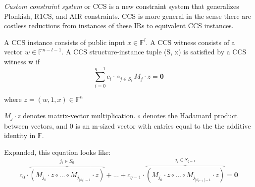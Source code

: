\documentclass[
    9pt,            %
    techreport,        %
    affiltop,       %
]{art}
\begin{document}
\textit{Custom constraint system} or CCS is a new constraint system that generalizes Plonkish, R1CS, and AIR constraints. CCS is more general in the sense there are costless reductions from instances of these IRs to equivalent CCS instances.

A CCS instance consists of public input $x \in \mathbb{F}^l$. A CCS witness consists of a vector $w \in \mathbb{F}^{n-l-1}$. A CCS structure-instance tuple (S, x) is satisfied by a CCS witness w if 
\begin{equation}
    \sum_{i=0}^{q-1} c_i \cdot \circ_{j \in S_i} M_j \cdot z = \mathbf{0}
\end{equation}

where $z = (w, 1, x) \in \mathbb{F}^n$

$M_j \cdot z$ denotes matrix-vector multiplication. $\circ$ denotes the Hadamard product between vectors, and 0 is an m-sized vector with entries equal to the the additive identity in $\mathbb{F}$.

Expanded, this equation looks like:
\begin{equation*}
    c_0 \cdot \overbrace{(M_{j_{0}} \cdot z \circ ... \circ M_{j_{|{S_{0}}|-1}} \cdot z)}^{j_i \in S_0} + ... + c_{q-1} \cdot \overbrace{(M_{j_{0}} \cdot z \circ ... \circ M_{j_{|{S_{q-1}}|-1}} \cdot z)}^{j_i \in S_{q-1}} = \mathbf{0}
\end{equation*}
\end{document}
